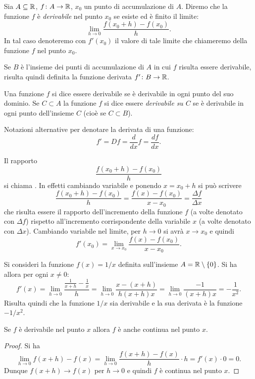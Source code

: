 \begin{definition}[derivata]
\mymark{***}
Sia $A\subseteq \mathbb R$, $f\colon A \to \mathbb R$, $x_0$ un punto di accumulazione di $A$.
Diremo che la funzione $f$ è \emph{derivabile} nel punto $x_0$ se esiste
ed è finito il limite:
\[
  \lim_{h\to 0} \frac{f(x_0+h) - f(x_0)}{h}.
\]
In tal caso denoteremo con $f'(x_0)$ il valore di tale limite che chiameremo
 della funzione $f$ nel punto $x_0$.

Se $B$ è l'insieme dei punti di accumulazione di $A$ in cui $f$ risulta essere derivabile, risulta quindi definita la funzione derivata $f'\colon B \to \mathbb R$.

Una funzione $f$ si dice essere derivabile se è derivabile in ogni punto del suo dominio.
Se $C\subset A$ la funzione $f$ si dice essere \emph{derivabile su $C$} se è derivabile in ogni punto dell'insieme $C$ (cioè se $C\subset B$).

Notazioni alternative per denotare la derivata di una funzione:
\[
  f' = Df = \frac{d}{dx} f = \frac{df}{dx}.
\]
\end{definition}

Il rapporto
\[
\frac{f(x_0+h) - f(x_0)}{h}
\]
si chiama . In effetti cambiando variabile e ponendo $x=x_0+h$ si può scrivere
\[
\frac{f(x_0+h) - f(x_0)}{h}
= \frac{f(x) - f(x_0)}{x-x_0}
= \frac{\Delta f}{\Delta x}
\]
che risulta essere il rapporto dell'incremento della funzione $f$ (a volte denotato con $\Delta f$) rispetto all'incremento corrispondente della variabile $x$ (a volte denotato con $\Delta x$).
Cambiando variabile nel limite, per $h\to 0$ si avrà $x\to x_0$
e quindi
\[
 f'(x_0) = \lim_{x\to x_0} \frac{f(x)-f(x_0)}{x-x_0}.
\]

\begin{example}
\mymark{**}
Si consideri la funzione $f(x) = 1/x$ definita sull'insieme $A = \mathbb R \setminus {\left\{ 0 \right\}}$. Si ha allora per ogni $x\neq 0$:
\[
  f'(x) = \lim_{h\to 0} \frac{\frac{1}{x+h} - \frac{1}{x}}{h}
        = \lim_{h\to 0} \frac{x - (x+h)}{h(x+h)x}
        = \lim_{h\to 0} \frac{-1}{(x+h)x} = -\frac{1}{x^2}.
\]
Risulta quindi che la funzione $1/x$ sia derivabile e la sua derivata è la funzione $-1/x^2$.
\end{example}

\begin{theorem}
\mymark{***}
Se $f$ è derivabile nel punto $x$ allora $f$ è anche continua nel punto $x$.
\end{theorem}
%
\begin{proof}
\mymark{***}
Si ha
\[
  \lim_{h\to 0} f(x+h) - f(x) = \lim_{h\to 0} \frac{f(x+h) - f(x)}{h} \cdot h
  = f'(x) \cdot 0 = 0.
\]
Dunque $f(x+h)\to f(x)$ per $h\to 0$ e quindi $f$ è continua nel punto $x$.
\end{proof}

